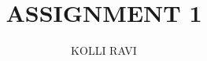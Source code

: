 \documentclass[journal,12pt,twocolumn]{IEEEtran}
\begin{document}
\makeatletter
{}
\makeatother
\let\StandardTheFigure\thefigure
\let\vec\mathbf
\renewcommand{\thefigure}{\theproblem}
\def\putbox#1#2#3{\makebox[0in][l]{\makebox[#1][l]{}\raisebox{\baselineskip}[0in][0in]{\raisebox{#2}[0in][0in]{#3}}}}
     \def\rightbox#1{\makebox[0in][r]{#1}}
     \def\centbox#1{\makebox[0in]{#1}}
     \def\topbox#1{\raisebox{-\baselineskip}[0in][0in]{#1}}
     \def\midbox#1{\raisebox{-0.5\baselineskip}[0in][0in]{#1}}
\vspace{3cm}
\title{ASSIGNMENT 1}
\author{KOLLI RAVI}
%
%
%
% 
%
\end{document}
